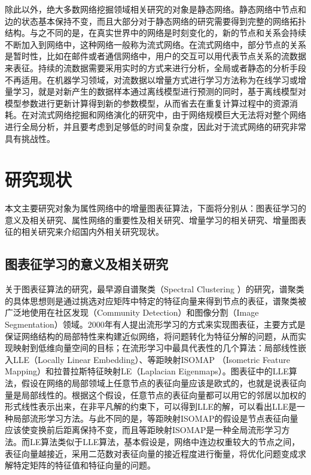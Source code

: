 除此以外，绝大多数网络挖掘领域相关研究的对象是静态网络。静态网络中节点和边的状态基本保持不变，而且大部分对于静态网络的研究需要得到完整的网络拓扑结构。与之不同的是，在真实世界中的网络是时刻变化的，新的节点和关系会持续不断加入到网络中，这种网络一般称为流式网络\cite{aggarwal2014evolutionary}。在流式网络中，部分节点的关系是暂时性，比如在邮件或者通信网络中，用户的交互可以用代表节点关系的流数据来表征。持续的流数据需要采用实时的方式来进行分析，全局或者静态的分析手段不再适用。在机器学习领域，对流数据以增量方式进行学习方法称为在线学习或增量学习，就是对新产生的数据样本通过离线模型进行预测的同时，基于离线模型对模型参数进行更新计算得到新的参数模型，从而省去在重复计算过程中的资源消耗。在对流式网络挖掘和网络演化的研究中，由于网络规模巨大无法将对整个网络进行全局分析，并且要考虑到足够低的时间复杂度，因此对于流式网络的研究非常具有挑战性\cite{zhao2011gsketch,le2012linked}。

\section{研究现状}
本文主要研究对象为属性网络中的增量图表征算法，下面将分别从：图表征学习的意义及相关研究、属性网络的重要性及相关研究、增量学习的相关研究、增量图表征的相关研究来介绍国内外相关研究现状。
\subsection{图表征学习的意义及相关研究}


关于图表征算法的研究，最早源自谱聚类（Spectral Clustering ）的研究，谱聚类的具体思想则是通过挑选对应矩阵中特定的特征向量来得到节点的表征，谱聚类被广泛地使用在社区发现（Community Detection）\cite{leskovec2010empirical}和图像分割（Image Segmentation）\cite{shi2000normalized}领域。2000年有人提出流形学习的方式来实现图表征，主要方式是保证网络结构的局部特性来构建近似网络，将问题转化为特征分解的问题，从而实现映射到低维向量空间的目标；在流形学习中最具代表性的几个算法：局部线性嵌入LLE\cite{roweis2000nonlinear}（Locally Linear Embedding）、等距映射ISOMAP\cite{tenenbaum2000global} （Isometric Feature Mapping）和拉普拉斯特征映射LE\cite{belkin2002laplacian}（Laplacian Eigenmaps）。图表征中的LLE算法，假设在网络的局部领域上任意节点的表征向量应该是欧式的，也就是说表征向量是局部线性的。根据这个假设，任意节点的表征向量都可以用它的邻居以加权的形式线性表示出来，在非平凡解的约束下，可以得到LLE的解，可以看出LLE是一种局部流形学习方法。与此不同的是，等距映射ISOMAP的假设是节点表征向量应该使变换前后距离保持不变，而且等距映射ISOMAP是一种全局流形学习方法。而LE算法类似于LLE算法，基本假设是，网络中连边权重较大的节点之间，表征向量越接近，采用二范数对表征向量的接近程度进行衡量，将优化问题变成求解特定矩阵的特征值和特征向量的问题。

